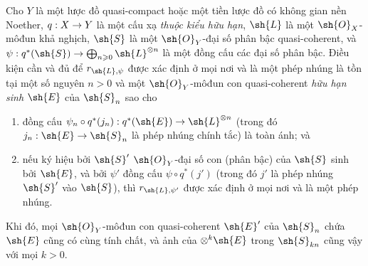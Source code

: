 \documentclass[oneside,10pt]{amsart}
\makeatletter
\renewcommand{\geq}{\geqslant}
\newcommand{\ega@arrow}[2]{\mathchoice{#1}{#2}{#2}{#2}}
\renewcommand{\to}{\ega@arrow{\longrightarrow}{\rightarrow}}
\let\EGAOriginalLabel\label
\renewcommand{\label}[1]{\phantomsection\EGAOriginalLabel{#1}}
\makeatother
\begin{document}
\begin{proposition}[3.8.5]
\label{II.3.8.5}
Cho $Y$ là một lược đồ quasi-compact hoặc một tiền lược đồ có không gian nền Noether, $q:X\to Y$ là một cấu xạ \emph{thuộc kiểu hữu hạn}, $\sh{L}$ là một $\sh{O}_X$-môđun khả nghịch, $\sh{S}$ là một $\sh{O}_Y$-đại số phân bậc quasi-coherent, và $\psi:q^*(\sh{S})\to\bigoplus_{n\geq0}\sh{L}^{\otimes n}$ là một đồng cấu các đại số phân bậc.
Điều kiện cần và đủ để $r_{\sh{L},\psi}$ được xác định ở mọi nơi và là một phép nhúng là tồn tại một số nguyên $n>0$ và một $\sh{O}_Y$-môđun con quasi-coherent \emph{hữu hạn sinh} $\sh{E}$ của $\sh{S}_n$ sao cho
\begin{enumerate}
  \item[a)] đồng cấu $\psi_n\circ q^*(j_n):q^*(\sh{E})\to\sh{L}^{\otimes n}$ (trong đó $j_n:\sh{E}\to\sh{S}_n$ là phép nhúng chính tắc) là toàn ánh; và
  \item[b)] nếu ký hiệu bởi $\sh{S}'$ $\sh{O}_Y$-đại số con (phân bậc) của $\sh{S}$ sinh bởi $\sh{E}$, và bởi $\psi'$ đồng cấu $\psi\circ q^*(j')$ (trong đó $j'$ là phép nhúng $\sh{S}'$ vào $\sh{S}$), thì $r_{\sh{L},\psi'}$ được xác định ở mọi nơi và là một phép nhúng.
\end{enumerate}

Khi đó, mọi $\sh{O}_Y$-môđun con quasi-coherent $\sh{E}'$ của $\sh{S}_n$ chứa $\sh{E}$ cũng có cùng tính chất, và ảnh của $\otimes^k\sh{E}$ trong $\sh{S}_{kn}$ cũng vậy với mọi $k>0$.
\end{proposition}
\end{document}
